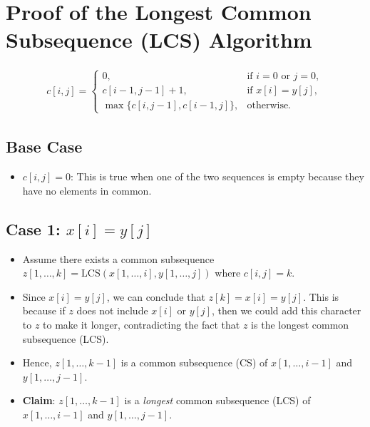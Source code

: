 \section{Proof of the Longest Common Subsequence (LCS) Algorithm}
\begin{align*}
    c[i, j] = \begin{cases}
        0, & \text{if } i = 0 \text{ or } j = 0, \\
        c[i-1, j-1] + 1, & \text{if } x[i] = y[j], \\
        \max\{c[i, j-1], c[i-1, j]\}, & \text{otherwise.}
    \end{cases}
\end{align*}

\subsection{Base Case}
\begin{itemize}
    \item \( c[i,j] = 0 \): This is true when one of the two sequences is empty because they have no elements in common.
\end{itemize}

\subsection{Case 1: \( x[i] = y[j] \)}
\begin{itemize}
    \item Assume there exists a common subsequence \( z[1,\dots,k] = \text{LCS}(x[1,\dots,i], y[1,\dots,j]) \) where \( c[i,j]=k \).
    \item Since \( x[i] = y[j] \), we can conclude that \( z[k] = x[i] = y[j] \). This is because if \( z \) does not include \( x[i] \) or \( y[j] \), then we could add this character to \( z \) to make it longer, contradicting the fact that \( z \) is the longest common subsequence (LCS).
    \item Hence, \( z[1,\dots,k-1] \) is a common subsequence (CS) of \( x[1,\dots,i-1] \) and \( y[1,\dots,j-1] \).
    \item \textbf{Claim}: \( z[1,\dots,k-1] \) is a \textit{longest} common subsequence (LCS) of \( x[1,\dots,i-1] \) and \( y[1,\dots,j-1] \).
\end{itemize}

